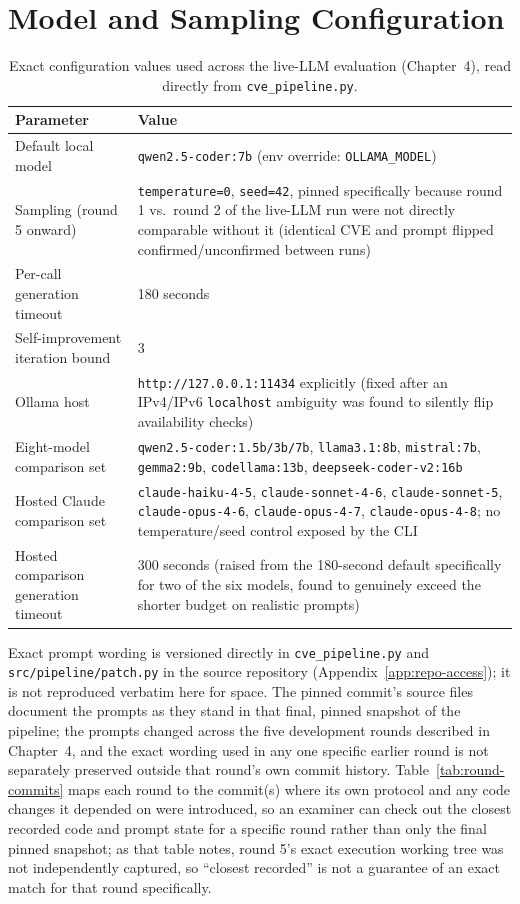 \documentclass[12pt,a4paper]{report}
\begin{document}
\section{Model and Sampling Configuration}

\begin{table}[H]
\centering
\caption{Exact configuration values used across the live-LLM evaluation (Chapter~4), read directly from \texttt{cve\_pipeline.py}.}
\begin{tabular}{@{}p{5cm}p{7cm}@{}}
\toprule
\textbf{Parameter} & \textbf{Value} \\
\midrule
Default local model & \texttt{qwen2.5-coder:7b} (env override: \texttt{OLLAMA\_MODEL}) \\
Sampling (round 5 onward) & \texttt{temperature=0}, \texttt{seed=42}, pinned specifically because round 1 vs.\ round 2 of the live-LLM run were not directly comparable without it (identical CVE and prompt flipped confirmed/unconfirmed between runs) \\
Per-call generation timeout & 180 seconds \\
Self-improvement iteration bound & 3 \\
Ollama host & \texttt{http://127.0.0.1:11434} explicitly (fixed after an IPv4/IPv6 \texttt{localhost} ambiguity was found to silently flip availability checks) \\
Eight-model comparison set & \texttt{qwen2.5-coder:1.5b/3b/7b}, \texttt{llama3.1:8b}, \texttt{mistral:7b}, \texttt{gemma2:9b}, \texttt{codellama:13b}, \texttt{deepseek-coder-v2:16b} \\
Hosted Claude comparison set & \texttt{claude-haiku-4-5}, \texttt{claude-sonnet-4-6}, \texttt{claude-sonnet-5}, \texttt{claude-opus-4-6}, \texttt{claude-opus-4-7}, \texttt{claude-opus-4-8}; no temperature/seed control exposed by the CLI \\
Hosted comparison generation timeout & 300 seconds (raised from the 180-second default specifically for two of the six models, found to genuinely exceed the shorter budget on realistic prompts) \\
\bottomrule
\end{tabular}
\end{table}

Exact prompt wording is versioned directly in \texttt{cve\_pipeline.py} and \texttt{src/pipeline/patch.py} in the source repository (Appendix~\ref{app:repo-access}); it is not reproduced verbatim here for space. The pinned commit's source files document the prompts as they stand in that final, pinned snapshot of the pipeline; the prompts changed across the five development rounds described in Chapter~4, and the exact wording used in any one specific earlier round is not separately preserved outside that round's own commit history. Table~\ref{tab:round-commits} maps each round to the commit(s) where its own protocol and any code changes it depended on were introduced, so an examiner can check out the closest recorded code and prompt state for a specific round rather than only the final pinned snapshot; as that table notes, round 5's exact execution working tree was not independently captured, so ``closest recorded'' is not a guarantee of an exact match for that round specifically.
\end{document}
